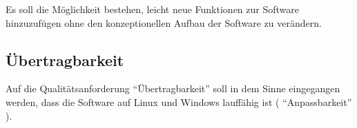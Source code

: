 \begin{flushleft}
Es soll die Möglichkeit bestehen, leicht neue Funktionen zur Software hinzuzufügen ohne den konzeptionellen Aufbau der Software zu verändern. 

\subsection{Übertragbarkeit} %
\label{sub:Übertragbarkeit}

Auf die Qualitätsanforderung ``Übertragbarkeit'' soll in dem Sinne eingegangen werden, dass die Software auf Linux und Windows lauffähig ist ( ``Anpassbarkeit'' ).


 
\end{flushleft}

